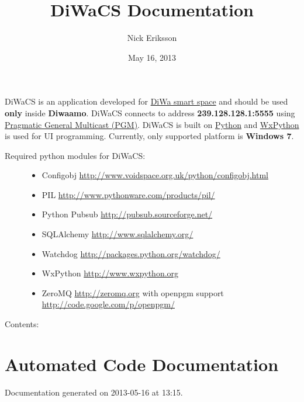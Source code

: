 \documentclass[letterpaper,10pt,english]{sphinxmanual}
\title{DiWaCS Documentation}
\date{May 16, 2013}
\author{Nick Eriksson}
\begin{document}
\maketitle
\tableofcontents
{}\label{index::doc}


DiWaCS is an application developed for \href{https://cse.aalto.fi/research/groups/stratus/research/research-projects/}{DiWa smart space} and should be used \textbf{only} inside \textbf{Diwaamo}. DiWaCS connects to address \textbf{239.128.128.1:5555} using \href{http://code.google.com/p/openpgm/}{Pragmatic General Multicast (PGM)}. DiWaCS is built on \href{http://www.python.org}{Python} and \href{http://www.wxpython.org}{WxPython} is used for UI programming. Currently, only supported platform is \textbf{Windows 7}.
\begin{description}
\item[{Required python modules for DiWaCS:}] \leavevmode\begin{itemize}
\item {} 
Configobj \href{http://www.voidspace.org.uk/python/configobj.html}{http://www.voidspace.org.uk/python/configobj.html}

\item {} 
PIL \href{http://www.pythonware.com/products/pil/}{http://www.pythonware.com/products/pil/}

\item {} 
Python Pubsub \href{http://pubsub.sourceforge.net/}{http://pubsub.sourceforge.net/}

\item {} 
SQLAlchemy \href{http://www.sqlalchemy.org/}{http://www.sqlalchemy.org/}

\item {} 
Watchdog  \href{http://packages.python.org/watchdog/}{http://packages.python.org/watchdog/}

\item {} 
WxPython \href{http://www.wxpython.org}{http://www.wxpython.org}

\item {} 
ZeroMQ \href{http://zeromq.org}{http://zeromq.org} with openpgm support \href{http://code.google.com/p/openpgm/}{http://code.google.com/p/openpgm/}

\end{itemize}

\end{description}

Contents:


\chapter{Automated Code Documentation}
\label{api:automated-code-documentation}\label{api::doc}\label{api:welcome-to-diwacs-documentation}
Documentation generated on 2013-05-16 at 13:15.
\end{document}
